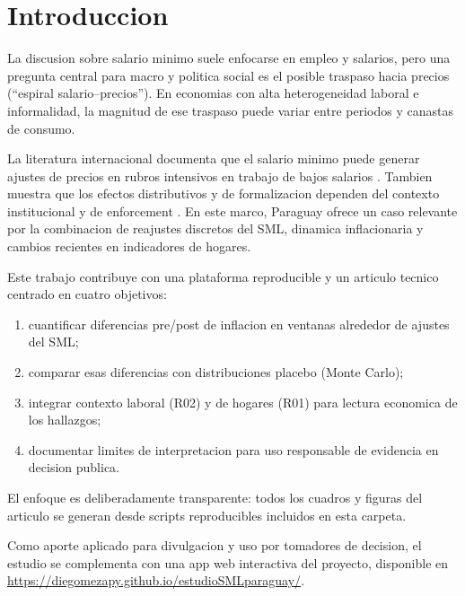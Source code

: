 \section{Introduccion}

La discusion sobre salario minimo suele enfocarse en empleo y salarios, pero una pregunta central para macro y politica social es el posible traspaso hacia precios (``espiral salario--precios''). En economias con alta heterogeneidad laboral e informalidad, la magnitud de ese traspaso puede variar entre periodos y canastas de consumo.

La literatura internacional documenta que el salario minimo puede generar ajustes de precios en rubros intensivos en trabajo de bajos salarios \citep{aaronson2008, cengiz2019}. Tambien muestra que los efectos distributivos y de formalizacion dependen del contexto institucional y de enforcement \citep{card1995, dube2019}. En este marco, Paraguay ofrece un caso relevante por la combinacion de reajustes discretos del SML, dinamica inflacionaria y cambios recientes en indicadores de hogares.

Este trabajo contribuye con una plataforma reproducible y un articulo tecnico centrado en cuatro objetivos:
\begin{enumerate}
  \item cuantificar diferencias pre/post de inflacion en ventanas alrededor de ajustes del SML;
  \item comparar esas diferencias con distribuciones placebo (Monte Carlo);
  \item integrar contexto laboral (R02) y de hogares (R01) para lectura economica de los hallazgos;
  \item documentar limites de interpretacion para uso responsable de evidencia en decision publica.
\end{enumerate}

El enfoque es deliberadamente transparente: todos los cuadros y figuras del articulo se generan desde scripts reproducibles incluidos en esta carpeta.

Como aporte aplicado para divulgacion y uso por tomadores de decision, el estudio se complementa con una app web interactiva del proyecto, disponible en \url{https://diegomezapy.github.io/estudioSMLparaguay/}.
